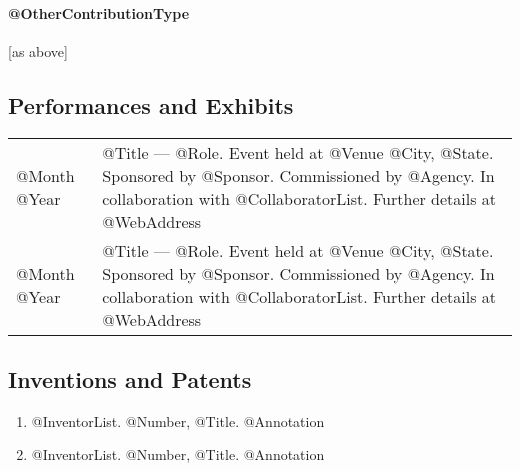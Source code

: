 \documentclass[10pt]{article}
\renewcommand{\new}[1]{\textcolor{red}{#1}}
\begin{document}
\printbibliography[title={\normalsize Book Chapters},
 type=incollection,
 keyword=nonref,
 notkeyword=electronic,
 resetnumbers=true
]

%
\printbibliography[title={\normalsize Electronic Publications},
 keyword=electronic,
 resetnumbers=true
]

\printbibliography[title={\normalsize \new{Technical Reports}},
 type=report,
 resetnumbers=true
]

\printbibliography[title={\normalsize Abstracts},
 keyword=abstract,
 resetnumbers=true
]

\printbibliography[title={\normalsize Reviews},
 keyword=review,
 resetnumbers=true
]

\paragraph{@OtherContributionType}
[as above]


\subsection*{Performances and Exhibits}
\smallskip

\begin{tabular}{l@{\quad\ }p{35em}} 
 @Month @Year
 & @Title --- @Role. Event held at @Venue @City, @State. 
   Sponsored by @Sponsor. 
   Commissioned by @Agency. 
   In collaboration with @CollaboratorList. 
   Further details at @WebAddress
   \medskip \\
 @Month @Year
 & @Title --- @Role. Event held at @Venue @City, @State. 
   Sponsored by @Sponsor. 
   Commissioned by @Agency. 
   In collaboration with @CollaboratorList. 
   Further details at @WebAddress
\end{tabular}

\subsection*{Inventions and Patents}
\smallskip
\begin{enumerate} \setlength{\itemsep}{0ex}
 \item @InventorList. @Number, @Title. @Annotation
 \item @InventorList. @Number, @Title. @Annotation
\end{enumerate}
\end{document}
